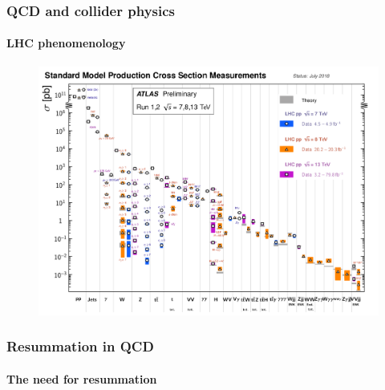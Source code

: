 \documentclass[aspectratio=43]{beamer}
\begin{document}
\begin{frame}
	
	\frametitle{QCD and collider physics}
	\framesubtitle{LHC phenomenology}
	
	\begin{figure}
		\includegraphics[width = 9.5 cm]{plots/part1/lhc_measurements.png}
	\end{figure}

\end{frame}

%
%

\begin{frame}


\end{frame}

\begin{frame}
	
	\frametitle{Resummation in QCD}
	\framesubtitle{The need for resummation}

\end{frame}
\end{document}

